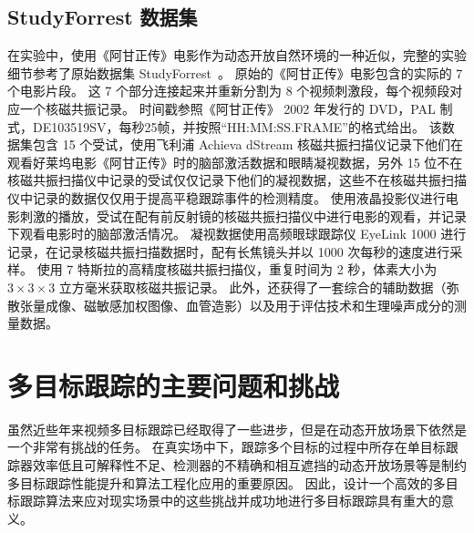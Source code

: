 \subsection{StudyForrest 数据集}
在实验中，使用《阿甘正传》电影作为动态开放自然环境的一种近似，完整的实验细节参考了原始数据集 StudyForrest~\cite{gaze_forrest}。
原始的《阿甘正传》电影包含的实际的 7 个电影片段。
这 7 个部分连接起来并重新分割为 8 个视频刺激段，每个视频段对应一个核磁共振记录。
时间戳参照《阿甘正传》 2002 年发行的 DVD，PAL 制式，DE103519SV，每秒25帧，并按照“HH:MM:SS.FRAME”的格式给出。
该数据集包含 15 个受试，使用飞利浦 Achieva dStream 核磁共振扫描仪记录下他们在观看好莱坞电影《阿甘正传》时的脑部激活数据和眼睛凝视数据，另外 15 位不在核磁共振扫描仪中记录的受试仅仅记录下他们的凝视数据，这些不在核磁共振扫描仪中记录的数据仅仅用于提高平稳跟踪事件的检测精度。
使用液晶投影仪进行电影刺激的播放，受试在配有前反射镜的核磁共振扫描仪中进行电影的观看，并记录下观看电影时的脑部激活情况。
凝视数据使用高频眼球跟踪仪 EyeLink 1000 进行记录，在记录核磁共振扫描数据时，配有长焦镜头并以 1000 次每秒的速度进行采样。
使用 7 特斯拉的高精度核磁共振扫描仪，重复时间为 2 秒，体素大小为 $3 \times 3 \times 3$ 立方毫米获取核磁共振记录。
此外，还获得了一套综合的辅助数据（弥散张量成像、磁敏感加权图像、血管造影）以及用于评估技术和生理噪声成分的测量数据。




\section{多目标跟踪的主要问题和挑战}
虽然近些年来视频多目标跟踪已经取得了一些进步，但是在动态开放场景下依然是一个非常有挑战的任务。
在真实场中下，跟踪多个目标的过程中所存在单目标跟踪器效率低且可解释性不足、检测器的不精确和相互遮挡的动态开放场景等是制约多目标跟踪性能提升和算法工程化应用的重要原因。
因此，设计一个高效的多目标跟踪算法来应对现实场景中的这些挑战并成功地进行多目标跟踪具有重大的意义。

